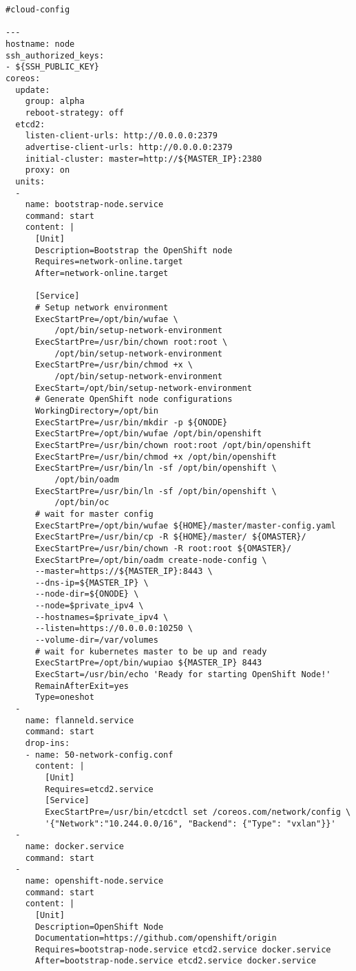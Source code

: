 \begin{verbatim}
#cloud-config

---
hostname: node
ssh_authorized_keys:
- ${SSH_PUBLIC_KEY}
coreos:
  update:
    group: alpha
    reboot-strategy: off
  etcd2:
    listen-client-urls: http://0.0.0.0:2379
    advertise-client-urls: http://0.0.0.0:2379
    initial-cluster: master=http://${MASTER_IP}:2380
    proxy: on
  units:
  -
    name: bootstrap-node.service
    command: start
    content: |
      [Unit]
      Description=Bootstrap the OpenShift node
      Requires=network-online.target
      After=network-online.target

      [Service]
      # Setup network environment
      ExecStartPre=/opt/bin/wufae \
          /opt/bin/setup-network-environment
      ExecStartPre=/usr/bin/chown root:root \
          /opt/bin/setup-network-environment
      ExecStartPre=/usr/bin/chmod +x \
          /opt/bin/setup-network-environment
      ExecStart=/opt/bin/setup-network-environment
      # Generate OpenShift node configurations
      WorkingDirectory=/opt/bin
      ExecStartPre=/usr/bin/mkdir -p ${ONODE}
      ExecStartPre=/opt/bin/wufae /opt/bin/openshift
      ExecStartPre=/usr/bin/chown root:root /opt/bin/openshift
      ExecStartPre=/usr/bin/chmod +x /opt/bin/openshift
      ExecStartPre=/usr/bin/ln -sf /opt/bin/openshift \
          /opt/bin/oadm
      ExecStartPre=/usr/bin/ln -sf /opt/bin/openshift \
          /opt/bin/oc
      # wait for master config
      ExecStartPre=/opt/bin/wufae ${HOME}/master/master-config.yaml
      ExecStartPre=/usr/bin/cp -R ${HOME}/master/ ${OMASTER}/
      ExecStartPre=/usr/bin/chown -R root:root ${OMASTER}/
      ExecStartPre=/opt/bin/oadm create-node-config \
      --master=https://${MASTER_IP}:8443 \
      --dns-ip=${MASTER_IP} \
      --node-dir=${ONODE} \
      --node=$private_ipv4 \
      --hostnames=$private_ipv4 \
      --listen=https://0.0.0.0:10250 \
      --volume-dir=/var/volumes
      # wait for kubernetes master to be up and ready
      ExecStartPre=/opt/bin/wupiao ${MASTER_IP} 8443
      ExecStart=/usr/bin/echo 'Ready for starting OpenShift Node!'
      RemainAfterExit=yes
      Type=oneshot
  -
    name: flanneld.service
    command: start
    drop-ins:
    - name: 50-network-config.conf
      content: |
        [Unit]
        Requires=etcd2.service
        [Service]
        ExecStartPre=/usr/bin/etcdctl set /coreos.com/network/config \
        '{"Network":"10.244.0.0/16", "Backend": {"Type": "vxlan"}}'
  -
    name: docker.service
    command: start
  -
    name: openshift-node.service
    command: start
    content: |
      [Unit]
      Description=OpenShift Node
      Documentation=https://github.com/openshift/origin
      Requires=bootstrap-node.service etcd2.service docker.service
      After=bootstrap-node.service etcd2.service docker.service


\end{verbatim}
